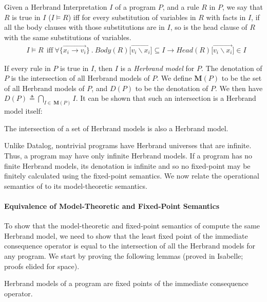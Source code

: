 Given a Herbrand Interpretation $I$ of a \core{} program $P$, and a rule $R$ in $P$, we say that $R$ is true in $I$ ($I \models R$) iff for every substitution of variables in $R$ with facts in $I$, if all the body clauses with those substitutions are in $I$, so is the head clause of $R$ with the same substitutions of variables.
\begin{align*}  
& I \models R\ ~\textrm{iff} ~
 \forall \{\overrightarrow{x_i \rightarrow v_i}\}\ .\ \textit{Body}(R)\big[\overrightarrow{v_i\backslash x_i}\big] \subseteq I \longrightarrow \textit{Head}(R)\big[\overrightarrow{v_i\backslash x_i}\big] \in I 
\end{align*}

If every rule in $P$ is true in $I$, then $I$ is a \emph{Herbrand model} for $P$. The denotation of $P$ is the intersection of all Herbrand models of $P$. We define $\mathbf{M}(P)$ to be the set of all Herbrand models of $P$, and $D(P)$ to be the denotation of $P$. We then have $D(P) \triangleq \!\!\!\!\!\!\bigcap\limits_{I\in\ \mathbf{M}(P)}\!\!\!\!\! I$. It can be shown that such an intersection is a Herbrand model itself:
\begin{lemma}
The intersection of a set of Herbrand models is also a Herbrand model.
\end{lemma}

Unlike Datalog, nontrivial \core{} programs have Herbrand universes
that are infinite. Thus, a \core{} program may have only infinite
Herbrand models. If a \core{} program has no finite Herbrand models,
its denotation is infinite and so no fixed-point may be finitely
calculated using the fixed-point semantics. We now relate the operational
semantics of \core{} to its model-theoretic semantics.

\paragraph*{Equivalence of Model-Theoretic and Fixed-Point Semantics}

To show that the model-theoretic and fixed-point semantics of \core{}
compute the same Herbrand model, we need to show that the least fixed
point of the immediate consequence operator is equal to the
intersection of all the Herbrand models for any program. We start by
proving the following lemmas (proved in Isabelle; proofs elided for
space).

\begin{lemma}
Herbrand models of a \core{} program are fixed points of the immediate consequence operator.    
\end{lemma}

